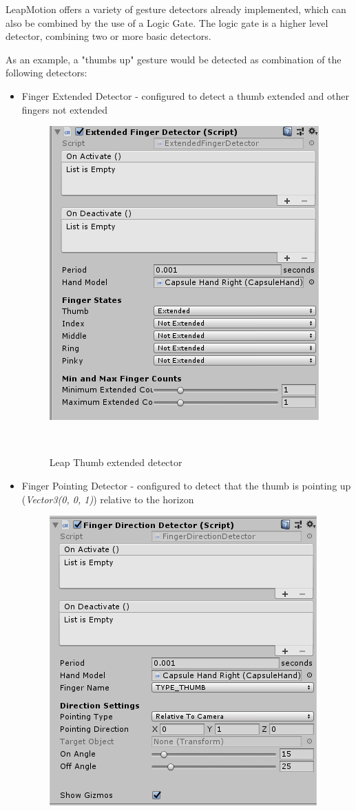 \documentclass[chi_draft]{sigchi}
\def\leap{LeapMotion}
\begin{document}
\leap{} offers a variety of gesture detectors already implemented, which can also be combined by the use of a Logic Gate. The logic gate is a higher level detector, combining two or more basic detectors.

As an example, a "thumbs up" gesture would be detected as combination of the following detectors:

\begin{itemize}
  \item Finger Extended Detector - configured to detect a thumb extended and other fingers not extended
    \begin{figure}[h]
      \centering
      \includegraphics[width=0.7\columnwidth]{figures/ThumbExtendedDetector.png}
      \caption{Leap Thumb extended detector}~\label{fig:figure2}
    \end{figure}
  \item Finger Pointing Detector - configured to detect that the thumb is pointing up (\textit{Vector3(0, 0, 1)}) relative to the horizon
    \begin{figure}[h]
      \centering
      \includegraphics[width=0.7\columnwidth]{figures/ThumbPointingUpDetector.PNG}

\end{figure}
\end{itemize}
\end{document}
